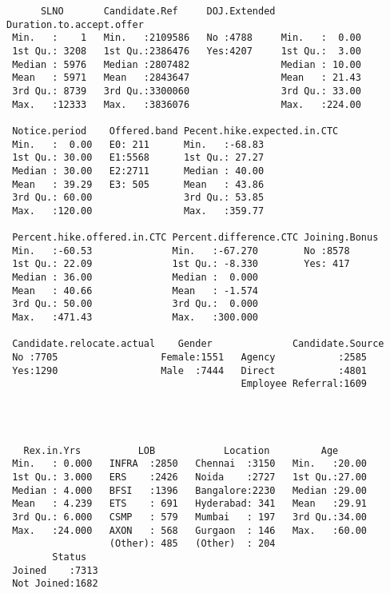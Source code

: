 \documentclass[11pt]{article}
\begin{document}
    
    \begin{verbatim}
      SLNO       Candidate.Ref     DOJ.Extended Duration.to.accept.offer
 Min.   :    1   Min.   :2109586   No :4788     Min.   :  0.00          
 1st Qu.: 3208   1st Qu.:2386476   Yes:4207     1st Qu.:  3.00          
 Median : 5976   Median :2807482                Median : 10.00          
 Mean   : 5971   Mean   :2843647                Mean   : 21.43          
 3rd Qu.: 8739   3rd Qu.:3300060                3rd Qu.: 33.00          
 Max.   :12333   Max.   :3836076                Max.   :224.00          
                                                                        
 Notice.period    Offered.band Pecent.hike.expected.in.CTC
 Min.   :  0.00   E0: 211      Min.   :-68.83             
 1st Qu.: 30.00   E1:5568      1st Qu.: 27.27             
 Median : 30.00   E2:2711      Median : 40.00             
 Mean   : 39.29   E3: 505      Mean   : 43.86             
 3rd Qu.: 60.00                3rd Qu.: 53.85             
 Max.   :120.00                Max.   :359.77             
                                                          
 Percent.hike.offered.in.CTC Percent.difference.CTC Joining.Bonus
 Min.   :-60.53              Min.   :-67.270        No :8578     
 1st Qu.: 22.09              1st Qu.: -8.330        Yes: 417     
 Median : 36.00              Median :  0.000                     
 Mean   : 40.66              Mean   : -1.574                     
 3rd Qu.: 50.00              3rd Qu.:  0.000                     
 Max.   :471.43              Max.   :300.000                     
                                                                 
 Candidate.relocate.actual    Gender              Candidate.Source
 No :7705                  Female:1551   Agency           :2585   
 Yes:1290                  Male  :7444   Direct           :4801   
                                         Employee Referral:1609   
                                                                  
                                                                  
                                                                  
                                                                  
   Rex.in.Yrs          LOB            Location         Age       
 Min.   : 0.000   INFRA  :2850   Chennai  :3150   Min.   :20.00  
 1st Qu.: 3.000   ERS    :2426   Noida    :2727   1st Qu.:27.00  
 Median : 4.000   BFSI   :1396   Bangalore:2230   Median :29.00  
 Mean   : 4.239   ETS    : 691   Hyderabad: 341   Mean   :29.91  
 3rd Qu.: 6.000   CSMP   : 579   Mumbai   : 197   3rd Qu.:34.00  
 Max.   :24.000   AXON   : 568   Gurgaon  : 146   Max.   :60.00  
                  (Other): 485   (Other)  : 204                  
        Status    
 Joined    :7313  
 Not Joined:1682  
                  
                  
                  
                  
                  
    \end{verbatim}
\end{document}
